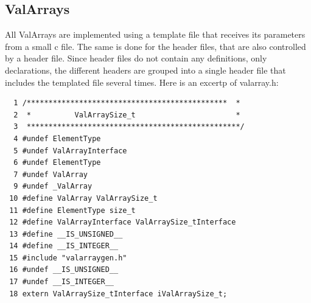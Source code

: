 \documentclass[12pt,a4paper]{memoir} %
\begin{document}
{{\subsection{ValArrays}
All ValArrays are implemented using a template file that receives its parameters from a small c file. The same is done for the header files, that
are also controlled by a header file. Since header files do not contain any definitions, only declarations, the different headers are grouped into
a single header file that includes the templated file several times. Here is an excertp of valarray.h:
\begin{verbatim}
  1 /**********************************************  *       
  2  *          ValArraySize_t                       *
  3  *************************************************/ 
  4 #undef ElementType
  5 #undef ValArrayInterface
  6 #undef ElementType
  7 #undef ValArray
  9 #undef _ValArray
 10 #define ValArray ValArraySize_t
 11 #define ElementType size_t
 12 #define ValArrayInterface ValArraySize_tInterface
 13 #define __IS_UNSIGNED__
 14 #define __IS_INTEGER__
 15 #include "valarraygen.h"
 16 #undef __IS_UNSIGNED__
 17 #undef __IS_INTEGER__
 18 extern ValArraySize_tInterface iValArraySize_t;
 

\end{verbatim}}}
\end{document}
